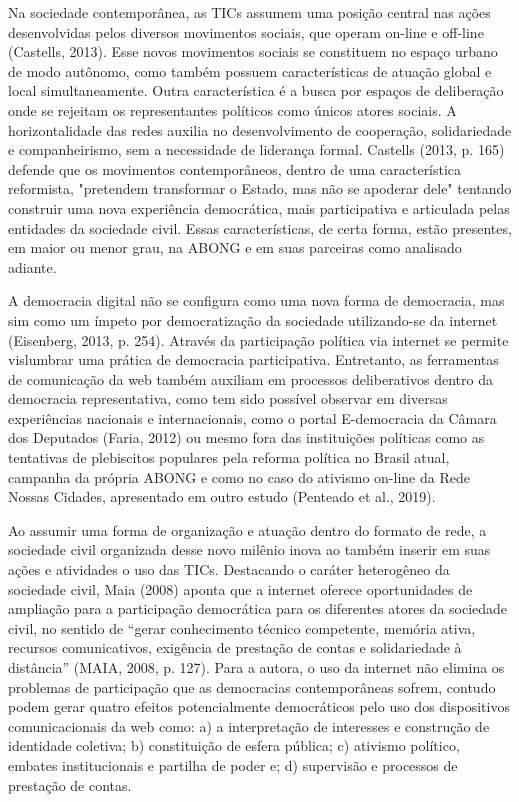 Na sociedade contemporânea, as TICs assumem uma posição central nas
ações desenvolvidas pelos diversos movimentos sociais, que operam
on-line e off-line (Castells, 2013). Esse novos movimentos sociais se
constituem no espaço urbano de modo autônomo, como também possuem
características de atuação global e local simultaneamente. Outra
característica é a busca por espaços de deliberação onde se rejeitam os
representantes políticos como únicos atores sociais. A horizontalidade
das redes auxilia no desenvolvimento de cooperação, solidariedade e
companheirismo, sem a necessidade de liderança formal. Castells (2013,
p. 165) defende que os movimentos contemporâneos, dentro de uma
característica reformista, "pretendem transformar o Estado, mas não se
apoderar dele" tentando construir uma nova experiência democrática, mais
participativa e articulada pelas entidades da sociedade civil. Essas
características, de certa forma, estão presentes, em maior ou menor
grau, na ABONG e em suas parceiras como analisado adiante.

A democracia digital não se configura como uma nova forma de democracia,
mas sim como um ímpeto por democratização da sociedade utilizando-se da
internet (Eisenberg, 2013, p. 254). Através da participação política via
internet se permite vislumbrar uma prática de democracia participativa.
Entretanto, as ferramentas de comunicação da web também auxiliam em
processos deliberativos dentro da democracia representativa, como tem
sido possível observar em diversas experiências nacionais e
internacionais, como o portal E-democracia da Câmara dos Deputados
(Faria, 2012) ou mesmo fora das instituições políticas como as
tentativas de plebiscitos populares pela reforma política no Brasil
atual, campanha da própria ABONG e como no caso do ativismo on-line da
Rede Nossas Cidades, apresentado em outro estudo (Penteado et al.,
2019).

Ao assumir uma forma de organização e atuação dentro do formato de rede,
a sociedade civil organizada desse novo milênio inova ao também inserir
em suas ações e atividades o uso das TICs. Destacando o caráter
heterogêneo da sociedade civil, Maia (2008) aponta que a internet
oferece oportunidades de ampliação para a participação democrática para
os diferentes atores da sociedade civil, no sentido de ``gerar
conhecimento técnico competente, memória ativa, recursos comunicativos,
exigência de prestação de contas e solidariedade à distância'' (MAIA,
2008, p. 127). Para a autora, o uso da internet não elimina os problemas
de participação que as democracias contemporâneas sofrem, contudo podem
gerar quatro efeitos potencialmente democráticos pelo uso dos
dispositivos comunicacionais da web como: a) a interpretação de
interesses e construção de identidade coletiva; b) constituição de
esfera pública; c) ativismo político, embates institucionais e partilha
de poder e; d) supervisão e processos de prestação de contas.

